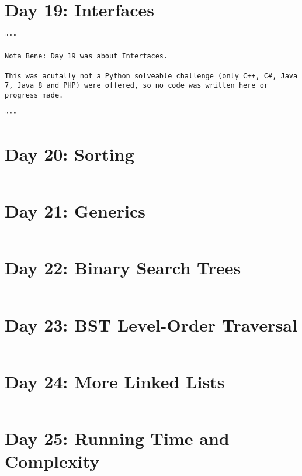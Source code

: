 \documentclass[11pt,a4paper]{article}
\begin{document}
\newpage
\section{Day 19: Interfaces}
\begin{lstlisting}
"""

Nota Bene: Day 19 was about Interfaces.

This was acutally not a Python solveable challenge (only C++, C#, Java 7, Java 8 and PHP) were offered, so no code was written here or progress made. 

"""
\end{lstlisting}


\newpage
\section{Day 20: Sorting}
\begin{lstlisting}
\end{lstlisting}

\newpage
\section{Day 21: Generics}
\begin{lstlisting}
\end{lstlisting}

\newpage
\section{Day 22: Binary Search Trees}
\begin{lstlisting}
\end{lstlisting}

\newpage
\section{Day 23: BST Level-Order Traversal}
\begin{lstlisting}
\end{lstlisting}

\newpage
\section{Day 24: More Linked Lists}
\begin{lstlisting}
\end{lstlisting}

\newpage
\section{Day 25: Running Time and Complexity}
\begin{lstlisting}
\end{lstlisting}
\end{document}
